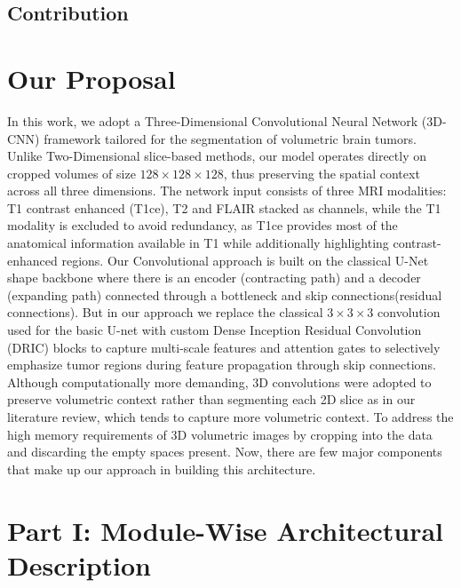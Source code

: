 \documentclass[a4paper,fleqn]{cas-dc}
\begin{document}
\subsection{Contribution}



\section{Our Proposal}

In this work, we adopt a Three-Dimensional Convolutional Neural Network (3D-CNN) framework tailored for the segmentation of volumetric brain tumors. Unlike Two-Dimensional slice-based methods, our model operates directly on cropped volumes of size $128\times128\times128$, thus preserving the spatial context across all three dimensions. The network input consists of three MRI modalities: T1 contrast enhanced (T1ce), T2 and FLAIR stacked as channels, while the T1 modality is excluded to avoid redundancy, as T1ce provides most of the anatomical information available in T1 while additionally highlighting contrast-enhanced regions. Our Convolutional approach is built on the classical U-Net shape backbone where there is an encoder (contracting path) and a decoder (expanding path) connected through a bottleneck and skip connections(residual connections). But in our approach we replace the classical $3\times3\times3$ convolution used for the basic U-net with custom Dense Inception Residual Convolution (DRIC) blocks to capture multi-scale features and attention gates to selectively emphasize tumor regions during feature propagation through skip connections. Although computationally more demanding, 3D convolutions were adopted to preserve volumetric context rather than segmenting each 2D slice as in our literature review, which tends to capture more volumetric context. To address the high memory requirements of 3D volumetric images by cropping into the data and discarding the empty spaces present. Now, there are few major components that make up our approach in building this architecture.



\section*{Part I: Module-Wise Architectural Description}
\end{document}

